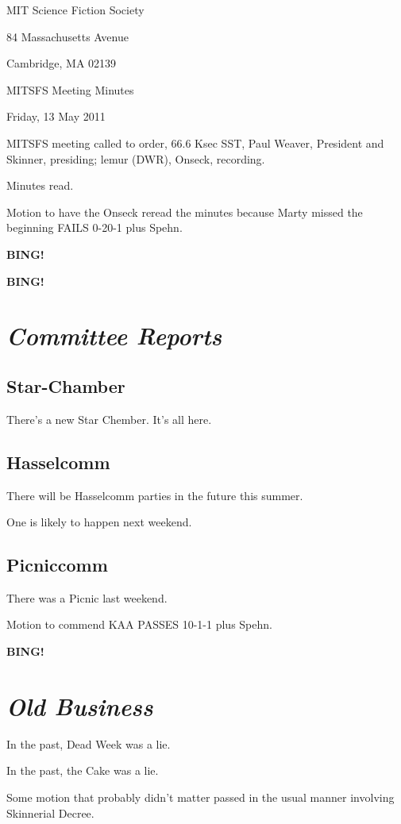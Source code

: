 \documentclass[10pt]{article}
\newcommand{\bing}{{\bf BING!} }
\newcommand{\goto}[1]{\bing \vskip 12pt \section*{{\em{#1}}}}
\newcommand{\ps}{ plus Spehn\xspace}
\newcommand{\skinner}{Paul Weaver, President and Skinner}
\newcommand{\onseck}{lemur (DWR), Onseck}
\newcommand{\meetingdate}{Friday, 13 May 2011}
\begin{document}
\begin{center}

MIT Science Fiction Society

84 Massachusetts Avenue

Cambridge, MA 02139

\vspace{12pt}

MITSFS Meeting Minutes

\meetingdate

\end{center}

\vspace{18pt}

\setlength{\parskip}{6pt}

\noindent
MITSFS meeting called to order, 66.6 Ksec SST,
\skinner, presiding; \onseck, recording.

Minutes read.

Motion to have the Onseck reread the minutes because Marty missed
the beginning FAILS 0-20-1\ps.

\bing

\goto{Committee Reports}


\subsection*{Star-Chamber}

There's a new Star Chember.  It's all here.


\subsection*{Hasselcomm}

There will be Hasselcomm parties in the future this summer.

One is likely to happen next weekend.


\subsection*{Picniccomm}

There was a Picnic last weekend.

Motion to commend KAA PASSES 10-1-1\ps.


\goto{Old Business}

In the past, Dead Week was a lie.

In the past, the Cake was a lie.

Some motion that probably didn't matter passed in the usual
manner involving Skinnerial Decree.
\end{document}
